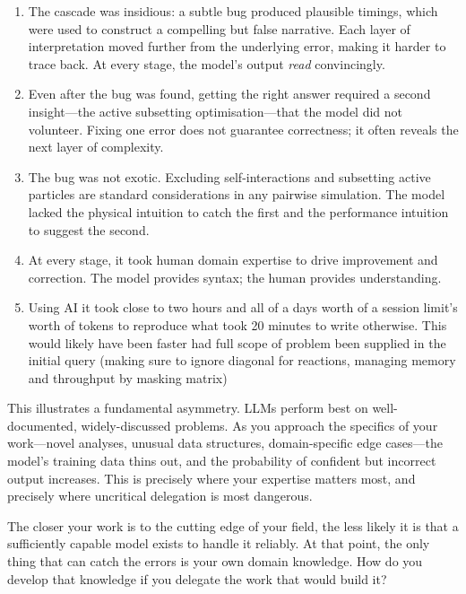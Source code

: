 \begin{enumerate}
    \item The cascade was insidious: a subtle bug produced plausible timings, which were used to construct a compelling but false narrative. Each layer of interpretation moved further from the underlying error, making it harder to trace back. At every stage, the model's output \emph{read} convincingly.
    \item Even after the bug was found, getting the right answer required a second insight---the active subsetting optimisation---that the model did not volunteer. Fixing one error does not guarantee correctness; it often reveals the next layer of complexity.
    \item The bug was not exotic. Excluding self-interactions and subsetting active particles are standard considerations in any pairwise simulation. The model lacked the physical intuition to catch the first and the performance intuition to suggest the second.
    \item At every stage, it took human domain expertise to drive improvement and correction. The model provides syntax; the human provides understanding.
	\item Using AI it took close to two hours and all of a days worth of a session limit's worth of tokens to reproduce what took 20 minutes to write otherwise. This would likely have been faster had full scope of problem been supplied in the initial query (making sure to ignore diagonal for reactions, managing memory and throughput by masking matrix)
\end{enumerate}

This illustrates a fundamental asymmetry. LLMs perform best on well-documented, widely-discussed problems. As you approach the specifics of your work---novel analyses, unusual data structures, domain-specific edge cases---the model's training data thins out, and the probability of confident but incorrect output increases. This is precisely where your expertise matters most, and precisely where uncritical delegation is most dangerous.

\begin{ponder}
The closer your work is to the cutting edge of your field, the less likely it is that a sufficiently capable model exists to handle it reliably. At that point, the only thing that can catch the errors is your own domain knowledge. How do you develop that knowledge if you delegate the work that would build it?
\end{ponder}


